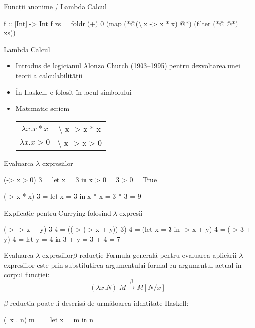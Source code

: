 \documentclass[xcolor=pdftex,romanian,colorlinks]{beamer}
\begin{document}
\begin{frame}[fragile]{Funcții anonime / Lambda Calcul}
\begin{asciihs}
f :: [Int] -> Int
f xs = foldr (+) 0 
         (map (*@\color{blue}(\textbackslash\; x -> x * x) @*) 
            (filter (*@\color{blue}{(\textbackslash\; x -> x > 0)} @*) xs))
\end{asciihs}

\begin{block}{Lambda Calcul}
\begin{itemize}
\item Introdus de logicianul Alonzo Church (1903--1995) pentru dezvoltarea unei teorii a calculabilității
\item În Haskell, \structure{\textbackslash} e folosit în locul simbolului \structure{$\lambda$}
\item Matematic scriem 
\begin{tabular}{c@{ în loc de }c}
$\lambda x. x * x$ & \textbackslash\; x -> x * x
\\
$\lambda x. x > 0$ & \textbackslash\; x -> x > 0
\end{tabular}
\end{itemize}
\end{block}
\end{frame}

\begin{frame}[fragile]{Evaluarea $\lambda$-expresiilor}
\begin{asciihs}
  (\x -> x > 0) 3
=
  let x = 3 in x > 0
=
  3 > 0
=
  True


  (\x -> x * x) 3
=
  let x = 3 in x * x
=
  3 * 3
=
  9
\end{asciihs}
\end{frame}

\begin{frame}[fragile]{Explicație pentru Currying folosind $\lambda$-expresii }
\begin{asciihs}
  (\x -> \y -> x + y) 3 4
=
  ((\x -> (\y -> x + y)) 3) 4
=
  (let x = 3 in \y -> x + y) 4
=
  (\y -> 3 + y) 4
=
  let y = 4 in 3 + y
=
  3 + 4
=
  7
\end{asciihs}
\end{frame}


\begin{frame}[fragile]{Evaluarea $\lambda$-expresiilor}{$\beta$-reducție}
Formula generală pentru evaluarea aplicării $\lambda$-expresiilor este prin substitutirea
argumentului formal cu argumentul actual în corpul funcției:
\[(\lambda x . N)\; M  \xrightarrow{\beta} M[N / x]\]

$\beta$-reducția poate fi descrisă de următoarea identitate Haskell:
\begin{asciihs}
(\ x . n) m == let x = m in n
\end{asciihs}
\end{frame}
\end{document}

